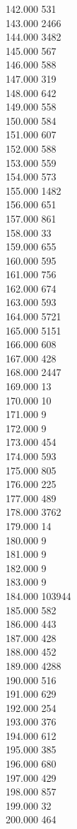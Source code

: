 { 142.000	531 \\
 143.000	2466 \\
 144.000	3482 \\
 145.000	567 \\
 146.000	588 \\
 147.000	319 \\
 148.000	642 \\
 149.000	558 \\
 150.000	584 \\
 151.000	607 \\
 152.000	588 \\
 153.000	559 \\
 154.000	573 \\
 155.000	1482 \\
 156.000	651 \\
 157.000	861 \\
 158.000	33 \\
 159.000	655 \\
 160.000	595 \\
 161.000	756 \\
 162.000	674 \\
 163.000	593 \\
 164.000	5721 \\
 165.000	5151 \\
 166.000	608 \\
 167.000	428 \\
 168.000	2447 \\
 169.000	13 \\
 170.000	10 \\
 171.000	9 \\
 172.000	9 \\
 173.000	454 \\
 174.000	593 \\
 175.000	805 \\
 176.000	225 \\
 177.000	489 \\
 178.000	3762 \\
 179.000	14 \\
 180.000	9 \\
 181.000	9 \\
 182.000	9 \\
 183.000	9 \\
 184.000	103944 \\
 185.000	582 \\
 186.000	443 \\
 187.000	428 \\
 188.000	452 \\
 189.000	4288 \\
 190.000	516 \\
 191.000	629 \\
 192.000	254 \\
 193.000	376 \\
 194.000	612 \\
 195.000	385 \\
 196.000	680 \\
 197.000	429 \\
 198.000	857 \\
 199.000	32 \\
 200.000	464 \\
}
